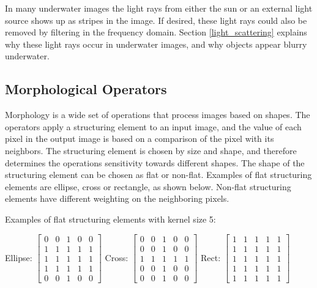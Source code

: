 In many underwater images the light rays from either the sun or an external light source shows up as stripes in the image. If desired, these light rays could also be removed by filtering in the frequency domain. Section \ref{light_scattering} explains why these light rays occur in underwater images, and why objects appear blurry underwater.




\subsection{Morphological Operators}

Morphology is a wide set of operations that process images based on shapes.\cite{website:mathworks_morphology} The operators apply a structuring element to an input image, and the value of each pixel in the output image is based on a comparison of the pixel with its neighbors. The structuring element is chosen by size and shape, and therefore determines the operations sensitivity towards different shapes.\cite{book:digital_image_processing}\cite{book:machine_vision}
The shape of the structuring element can be chosen as flat or non-flat. Examples of flat structuring elements are ellipse, cross or rectangle, as shown below. Non-flat structuring elements have different weighting on the neighboring pixels.

\noindent Examples of flat structuring elements with kernel size 5:

\noindent Ellipse: 
$\begin{bmatrix}
    0 & 0 & 1 & 0 & 0 \\
    1 & 1 & 1 & 1 & 1 \\
    1 & 1 & 1 & 1 & 1 \\
    1 & 1 & 1 & 1 & 1 \\
    0 & 0 & 1 & 0 & 0
\end{bmatrix}$ 
Cross: 
$\begin{bmatrix}
    0 & 0 & 1 & 0 & 0 \\
    0 & 0 & 1 & 0 & 0 \\
    1 & 1 & 1 & 1 & 1 \\
    0 & 0 & 1 & 0 & 0 \\
    0 & 0 & 1 & 0 & 0 
\end{bmatrix}$
Rect: 
$\begin{bmatrix}
    1 & 1 & 1 & 1 & 1 \\
    1 & 1 & 1 & 1 & 1 \\
    1 & 1 & 1 & 1 & 1 \\
    1 & 1 & 1 & 1 & 1 \\
    1 & 1 & 1 & 1 & 1
\end{bmatrix}$

